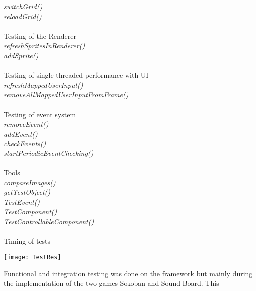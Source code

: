 \documentclass[]{article}
\begin{document}
\hspace*{10mm} \emph{switchGrid()}\\
\hspace*{10mm} \emph{reloadGrid()}
\\ \\
Testing of the Renderer\\
\hspace*{10mm} \emph{refreshSpritesInRenderer()}\\
\hspace*{10mm} \emph{addSprite()}
\\ \\
Testing of single threaded performance with UI \\
\hspace*{10mm} \emph{refreshMappedUserInput()}\\
\hspace*{10mm} \emph{removeAllMappedUserInputFromFrame()}
\\ \\
Testing of event system\\
\hspace*{10mm} \emph{removeEvent()}\\
\hspace*{10mm} \emph{addEvent()}\\
\hspace*{10mm} \emph{checkEvents()}\\
\hspace*{10mm} \emph{startPeriodicEventChecking()}
\\ \\
Tools\\
\hspace*{10mm} \emph{compareImages()}\\
\hspace*{10mm} \emph{getTestObject()}\\
\hspace*{10mm} \emph{TestEvent()}\\
\hspace*{10mm} \emph{TestComponent()}\\
\hspace*{10mm} \emph{TestControllableComponent()}
\\ \\
Timing of tests
\begin{center}
\texttt{[image: TestRes]}
\end{center}
Functional and integration testing was done on the framework but mainly
during the implementation of the two games Sokoban and Sound Board. This
\end{document}
